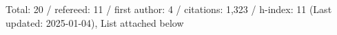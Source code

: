 Total: 20 / refereed: 11 / first author: 4 / citations: 1,323 / h-index: 11 (Last updated: 2025-01-04), List attached below